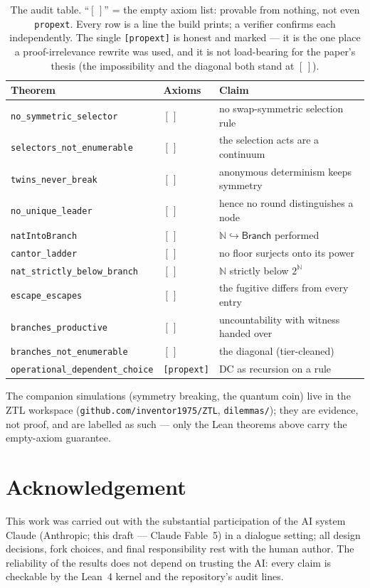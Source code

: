 \documentclass[11pt]{article}
\theoremstyle{remark}
\newcommand{\N}{\mathbb{N}}
\newcommand{\Branch}{\textsf{Branch}}
\begin{document}
\begin{table}[h]
\centering
\small
\begin{tabular}{@{}lll@{}}
\hline
\textbf{Theorem} & \textbf{Axioms} & \textbf{Claim} \\
\hline
\texttt{no\_symmetric\_selector}   & $[\,]$        & no swap-symmetric selection rule \\
\texttt{selectors\_not\_enumerable}& $[\,]$        & the selection acts are a continuum \\
\texttt{twins\_never\_break}       & $[\,]$        & anonymous determinism keeps symmetry \\
\texttt{no\_unique\_leader}        & $[\,]$        & hence no round distinguishes a node \\
\texttt{natIntoBranch}             & $[\,]$        & $\N \hookrightarrow \Branch$ performed \\
\texttt{cantor\_ladder}            & $[\,]$        & no floor surjects onto its power \\
\texttt{nat\_strictly\_below\_branch}& $[\,]$      & $\N$ strictly below $2^{\N}$ \\
\texttt{escape\_escapes}           & $[\,]$        & the fugitive differs from every entry \\
\texttt{branches\_productive}      & $[\,]$        & uncountability with witness handed over \\
\texttt{branches\_not\_enumerable} & $[\,]$        & the diagonal (tier-cleaned) \\
\texttt{operational\_dependent\_choice}& \texttt{[propext]} & DC as recursion on a rule \\
\hline
\end{tabular}
\caption{The audit table.  ``$[\,]$'' = the empty axiom list: provable
from nothing, not even \texttt{propext}.  Every row is a line the build
prints; a verifier confirms each independently.  The single
\texttt{[propext]} is honest and marked --- it is the one place a
proof-irrelevance rewrite was used, and it is not load-bearing for the
paper's thesis (the impossibility and the diagonal both stand at
$[\,]$).}
\label{tab:audit}
\end{table}

The companion simulations (symmetry breaking, the quantum coin) live in
the ZTL workspace (\texttt{github.com/inventor1975/ZTL},
\texttt{dilemmas/}); they are evidence, not proof, and are labelled as
such --- only the Lean theorems above carry the empty-axiom guarantee.

\section*{Acknowledgement}

This work was carried out with the substantial participation of the AI
system Claude (Anthropic; this draft --- Claude Fable~5) in a dialogue
setting; all design decisions, fork choices, and final responsibility
rest with the human author.  The reliability of the results does not
depend on trusting the AI: every claim is checkable by the Lean~4 kernel
and the repository's audit lines.
\end{document}
